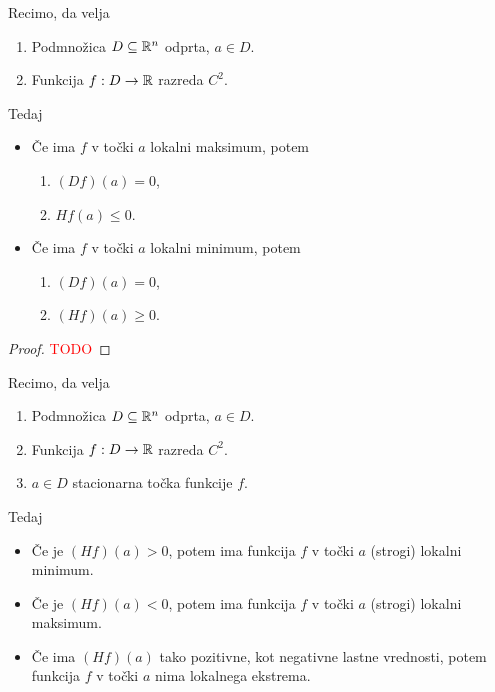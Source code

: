 \begin{trditev}
    Recimo, da velja
    \begin{enumerate}
        \item Podmnožica $D \subseteq \mathbb{R}^n$ odprta, $a \in D$.
        \item Funkcija $f: D \to \mathbb{R}$ razreda $C^2$.
    \end{enumerate}
    Tedaj
    \begin{itemize}
        \item Če ima $f$ v točki $a$ lokalni maksimum, potem
        \begin{enumerate}
            \item $(Df)(a) = 0$,
            \item $Hf(a) \leq 0$.
        \end{enumerate}
        \item Če ima $f$ v točki $a$ lokalni minimum, potem
        \begin{enumerate}
            \item $(Df)(a) = 0$,
            \item $(Hf)(a) \geq 0$.
        \end{enumerate}
    \end{itemize}
\end{trditev}

\begin{proof}
    \textcolor{red}{TODO}
\end{proof}

\begin{izrek}
    Recimo, da velja
    \begin{enumerate}
        \item Podmnožica $D \subseteq \mathbb{R}^n$ odprta, $a \in D$.
        \item Funkcija $f: D \to \mathbb{R}$ razreda $C^2$.
        \item $a \in D$ stacionarna točka funkcije $f$.
    \end{enumerate}
    Tedaj
    \begin{itemize}
        \item Če je $(Hf)(a) > 0$, potem ima funkcija $f$ v točki $a$ (strogi) lokalni minimum.
        \item Če je $(Hf)(a) < 0$, potem ima funkcija $f$ v točki $a$ (strogi) lokalni maksimum.
        \item Če ima $(Hf)(a)$ tako pozitivne, kot negativne lastne vrednosti, potem funkcija $f$ v točki $a$ nima lokalnega ekstrema.
    \end{itemize}
\end{izrek}

